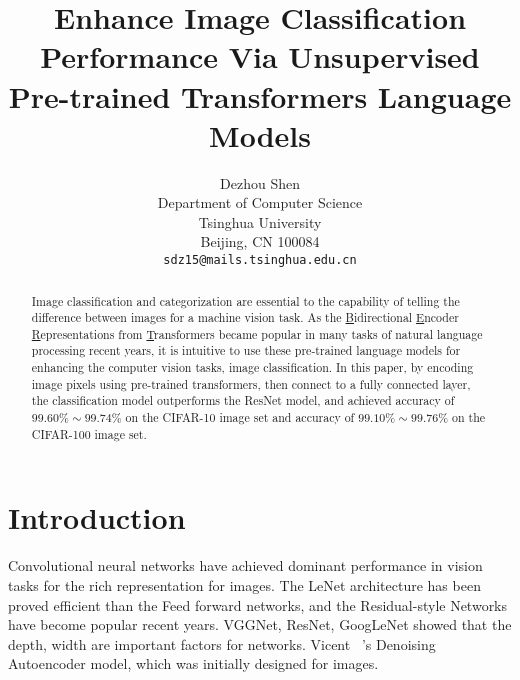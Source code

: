 \documentclass[10pt,twocolumn,letterpaper]{article}
\begin{document}
\title{Enhance Image Classification Performance Via Unsupervised Pre-trained Transformers Language Models}

\author{Dezhou Shen\\
Department of Computer Science\\
Tsinghua University\\
Beijing, CN 100084\\
{\tt\small sdz15@mails.tsinghua.edu.cn}
}

\maketitle
\ificcvfinal\thispagestyle{empty}\fi

\begin{abstract}

  Image classification and categorization are essential to the capability of telling the difference between images for a machine vision task.
  As the \underline{B}idirectional \underline{E}ncoder \underline{R}epresentations from \underline{T}ransformers became popular in many tasks of natural language processing recent years,
  it is intuitive to use these pre-trained language models for enhancing the computer vision tasks, \eg image classification.
  In this paper, by encoding image pixels using pre-trained transformers, then connect to a fully connected layer,
  the classification model outperforms the ResNet model,
  and achieved accuracy of $99.60\%\sim99.74\%$ on the CIFAR-10 image set and accuracy of $99.10\%\sim99.76\%$ on the CIFAR-100 image set.

\end{abstract}

\section{Introduction}

  Convolutional neural networks have achieved dominant performance in vision tasks for the rich representation for images.
  The LeNet architecture has been proved efficient than the Feed forward networks, and the Residual-style Networks have become popular recent years.
  VGGNet, ResNet, GoogLeNet showed that the depth, width are important factors for networks.
  Vicent \etal~\cite{vincent2008extracting}'s Denoising Autoencoder model, which was initially designed for images.
\end{document}
